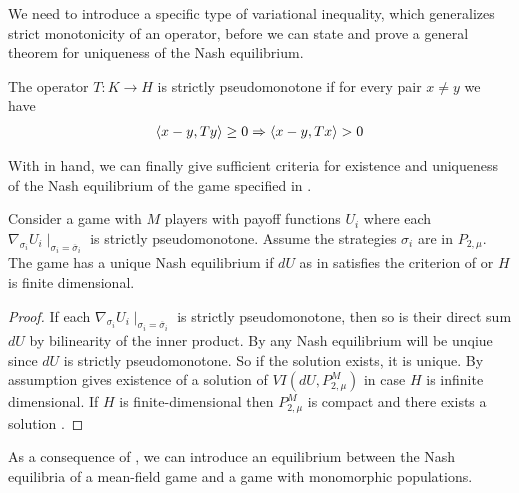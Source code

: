 We need to introduce a specific type of variational inequality, which generalizes strict monotonicity of an operator, before we can state and prove a general theorem for uniqueness of the Nash equilibrium.
\begin{definition}
  \label{def:strict_pm}
 The operator $T: K \to H$ is strictly pseudomonotone if for every pair $x\neq y$ we have
 \begin{align}
   \left \langle x-y,Ty \right \rangle \geq 0 \Rightarrow \left \langle x-y,Tx \right \rangle > 0
 \end{align}
\end{definition}
With  in hand, we can finally give sufficient criteria for existence and uniqueness of the Nash equilibrium of the game specified in .
\begin{theorem} \label{thm:nash_unique}
  Consider a game with $M$ players with payoff functions $U_i$ where each $\nabla_{\sigma_i} U_i \mid_{\sigma_i = \overbar{\sigma}_i}$ is strictly pseudomonotone. Assume the strategies $\sigma_i$ are in $P_{2,\mu}$. The game has a unique Nash equilibrium if $dU$ as in  satisfies the criterion of  or $H$ is finite dimensional.
\end{theorem}
\begin{proof}
   If each $\nabla_{\sigma_i} U_i \mid_{\sigma_i = \overbar{\sigma}_i}$ is strictly pseudomonotone, then so is their direct sum $dU$ by bilinearity of the inner product. By  any Nash equilibrium will be unqiue since $dU$ is strictly pseudomonotone. So if the solution exists, it is unique. By assumption  gives existence of a solution of $VI(dU,P_{2,\mu}^M)$ in case $H$ is infinite dimensional. If $H$ is finite-dimensional then $P_{2,\mu}^M$ is compact and there exists a solution .
\end{proof}
As a consequence of , we can introduce an equilibrium between the Nash equilibria of a mean-field game and a game with monomorphic populations.

